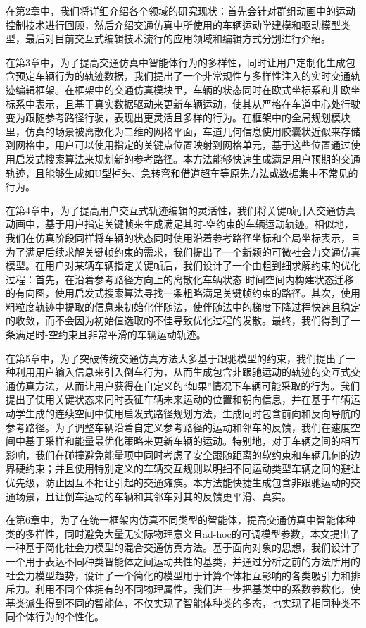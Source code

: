 在第2章中，我们将详细介绍各个领域的研究现状：首先会针对群组动画中的运动控制技术进行回顾，然后介绍交通仿真中所使用的车辆运动学建模和驱动模型类型，最后对目前交互式编辑技术流行的应用领域和编辑方式分别进行介绍。%

在第3章中，为了提高交通仿真中智能体行为的多样性，同时让用户定制化生成包含预定车辆行为的轨迹数据，我们提出了一个非常规性与多样性注入的实时交通轨迹编辑框架。在框架中的交通仿真模块里，车辆的状态同时在欧式坐标系和非欧坐标系中表示，且基于真实数据驱动来更新车辆运动，使其从严格在车道中心处行驶变为跟随参考路径行驶，表现出更灵活且多样的行为。在框架中的全局规划模块里，仿真的场景被离散化为二维的网格平面，车道几何信息使用胶囊状近似来存储到网格中，用户可以使用指定的关键点位置映射到网格单元，基于这些位置通过使用启发式搜索算法来规划新的参考路径。本方法能够快速生成满足用户预期的交通轨迹，且能够生成如U型掉头、急转弯和借道超车等原先方法或数据集中不常见的行为。

在第4章中，为了提高用户交互式轨迹编辑的灵活性，我们将关键帧引入交通仿真动画中，基于用户指定关键帧来生成满足其时-空约束的车辆运动轨迹。相似地，我们在仿真阶段同样将车辆的状态同时使用沿着参考路径坐标和全局坐标表示，且为了满足后续求解关键帧约束的需求，我们提出了一个新颖的可微社会力交通仿真模型。在用户对某辆车辆指定关键帧后，我们设计了一个由粗到细求解约束的优化过程：首先，在沿着参考路径方向上的离散化车辆状态-时间空间内构建状态迁移的有向图，使用启发式搜索算法寻找一条粗略满足关键帧约束的路径。其次，使用粗粒度轨迹中提取的信息来初始化伴随法，使伴随法中的梯度下降过程快速且稳定的收敛，而不会因为初始值选取的不佳导致优化过程的发散。最终，我们得到了一条满足时-空约束且非常平滑的车辆运动轨迹。

在第5章中，为了突破传统交通仿真方法大多基于跟驰模型的约束，我们提出了一种利用用户输入信息来引入倒车行为，从而生成包含非跟驰运动的轨迹的交互式交通仿真方法，从而让用户获得在自定义的“如果”情况下车辆可能采取的行为。我们提出了使用关键状态来同时表征车辆未来运动的位置和朝向信息，并在基于车辆运动学生成的连续空间中使用启发式路径规划方法，生成同时包含前向和反向导航的参考路径。为了调整车辆沿着自定义参考路径的运动和邻车的反馈，我们在速度空间中基于采样和能量最优化策略来更新车辆的运动。特别地，对于车辆之间的相互影响，我们在碰撞避免能量项中同时考虑了安全跟随距离的软约束和车辆几何的边界硬约束；并且使用特别定义的车辆交互规则以明细不同运动类型车辆之间的避让优先级，防止因互不相让引起的交通瘫痪。本方法能快捷生成包含非跟驰运动的交通场景，且让倒车运动的车辆和其邻车对其的反馈更平滑、真实。

在第6章中，为了在统一框架内仿真不同类型的智能体，提高交通仿真中智能体种类的多样性，同时避免大量无实际物理意义且ad-hoc的可调模型参数，本文提出了一种基于简化社会力模型的混合交通仿真方法。基于面向对象的思想，我们设计了一个用于表达不同种类智能体之间运动共性的基类，并通过分析之前的方法所用的社会力模型趋势，设计了一个简化的模型用于计算个体相互影响的各类吸引力和排斥力。利用不同个体拥有的不同物理属性，我们进一步把基类中的系数参数化，使基类派生得到不同的智能体，不仅实现了智能体种类的多态，也实现了相同种类不同个体行为的个性化。

